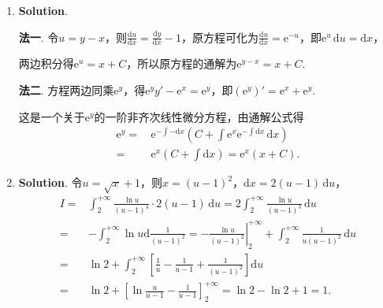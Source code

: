 \documentclass[../Main.tex]{subfiles}
\begin{document}
\begin{enumerate}
    \item \textbf{Solution}.

          \textbf{法一}. 令$u=y-x$，则$\frac{\mathrm{d}u}{\mathrm{d}x}=\frac{\mathrm{d}y}{\mathrm{d}x}
              -1$，原方程可化为$\frac{\mathrm{d}u}{\mathrm{d}x}=\mathrm{e}^{-u}$，即$\mathrm{e}
              ^{u}\,\mathrm{d}u=\mathrm{d}x$，

          两边积分得$\mathrm{e}^{u}=x+C$，所以原方程的通解为$\mathrm{e}^{y-x}=x+C$.

          \textbf{法二}. 方程两边同乘$\mathrm{e}^{y}$，得$\mathrm{e}^{y} y' - \mathrm{e}
              ^{x} = \mathrm{e}^{y}$，即$\left(\mathrm{e}^{y}\right)' = \mathrm{e}^{x} + \mathrm{e}
              ^{y}$.

          这是一个关于$\mathrm{e}^{y}$的一阶非齐次线性微分方程，由通解公式得
          \[
              \begin{aligned}
                  \mathrm{e}^{y} = & \,\mathrm{e}^{-\int -\mathrm{d}x}\left(C+\int \mathrm{e}^{x}\mathrm{e}^{-\int \mathrm{d}x}\,\mathrm{d}x\right) \\
                  =                & \,\mathrm{e}^{x}\left(C+\int \mathrm{d}x\right) = \mathrm{e}^{x}(x+C).
              \end{aligned}
          \]

    \item \textbf{Solution}. 令$u=\sqrt{x}+1$，则$x=(u-1)^{2}$，$\mathrm{d}x
              =2(u-1)\,\mathrm{d}u$，
          \[
              \begin{aligned}
                  I = & \int_{2}^{+\infty}\frac{\ln u}{(u-1)^4}\cdot 2(u-1)\,\mathrm{d}u = 2\int_{2}^{+\infty}\frac{\ln u}{(u-1)^3}\,\mathrm{d}u                                   \\
                  =   & -\int_{2}^{+\infty}\ln u \mathrm{d}\frac{1}{(u-1)^2}= -\left.\frac{\ln u}{(u-1)^2}\right|_{2}^{+\infty}+ \int_{2}^{+\infty}\frac{1}{u(u-1)^2}\,\mathrm{d}u \\
                  =   & \ln 2 + \int_{2}^{+\infty}\left[\frac{1}{u}-\frac{1}{u-1}+\frac{1}{(u-1)^2}\right]\mathrm{d}u                                                              \\
                  =   & \ln 2 + \left[\ln \frac{u}{u-1}- \frac{1}{u-1}\right]_{2}^{+\infty}= \ln 2 - \ln 2 + 1 = 1.
              \end{aligned}
          \]
\end{enumerate}
\end{document}
